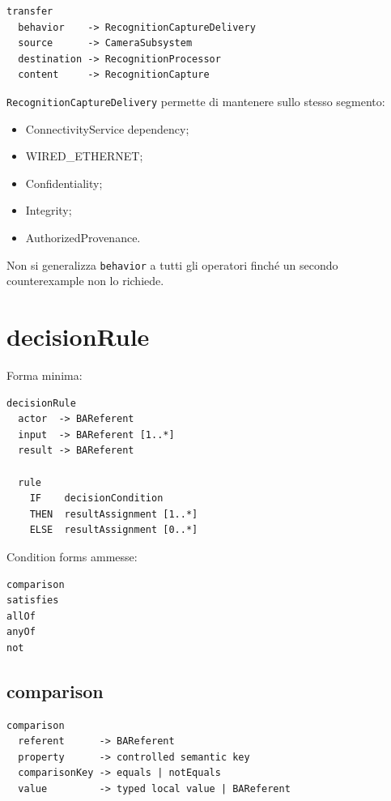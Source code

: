 \documentclass[11pt,a4paper]{article}
\newcommand{\code}[1]{\nolinkurl{#1}}
\begin{document}
\begin{examplebox}
\begin{lstlisting}
transfer
  behavior    -> RecognitionCaptureDelivery
  source      -> CameraSubsystem
  destination -> RecognitionProcessor
  content     -> RecognitionCapture
\end{lstlisting}

\code{RecognitionCaptureDelivery} permette di mantenere sullo stesso segmento:
\begin{itemize}
\item ConnectivityService dependency;
\item WIRED\_ETHERNET;
\item Confidentiality;
\item Integrity;
\item AuthorizedProvenance.
\end{itemize}
\end{examplebox}

Non si generalizza \code{behavior} a tutti gli operatori finché un secondo counterexample non lo richiede.

\section{decisionRule}

Forma minima:

\begin{lstlisting}
decisionRule
  actor  -> BAReferent
  input  -> BAReferent [1..*]
  result -> BAReferent

  rule
    IF    decisionCondition
    THEN  resultAssignment [1..*]
    ELSE  resultAssignment [0..*]
\end{lstlisting}

Condition forms ammesse:

\begin{lstlisting}
comparison
satisfies
allOf
anyOf
not
\end{lstlisting}

\subsection{comparison}

\begin{lstlisting}
comparison
  referent      -> BAReferent
  property      -> controlled semantic key
  comparisonKey -> equals | notEquals
  value         -> typed local value | BAReferent
\end{lstlisting}
\end{document}
